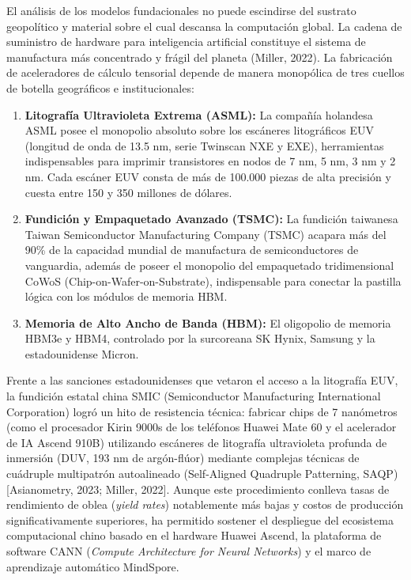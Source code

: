El análisis de los modelos fundacionales no puede escindirse del sustrato geopolítico y material sobre el cual descansa la computación global. La cadena de suministro de hardware para inteligencia artificial constituye el sistema de manufactura más concentrado y frágil del planeta (Miller, 2022). La fabricación de aceleradores de cálculo tensorial depende de manera monopólica de tres cuellos de botella geográficos e institucionales:
\begin{enumerate}
    \item \textbf{Litografía Ultravioleta Extrema (ASML):} La compañía holandesa ASML posee el monopolio absoluto sobre los escáneres litográficos EUV (longitud de onda de 13.5 nm, serie Twinscan NXE y EXE), herramientas indispensables para imprimir transistores en nodos de 7 nm, 5 nm, 3 nm y 2 nm. Cada escáner EUV consta de más de 100.000 piezas de alta precisión y cuesta entre 150 y 350 millones de dólares.
    \item \textbf{Fundición y Empaquetado Avanzado (TSMC):} La fundición taiwanesa Taiwan Semiconductor Manufacturing Company (TSMC) acapara más del 90\% de la capacidad mundial de manufactura de semiconductores de vanguardia, además de poseer el monopolio del empaquetado tridimensional CoWoS (Chip-on-Wafer-on-Substrate), indispensable para conectar la pastilla lógica con los módulos de memoria HBM.
    \item \textbf{Memoria de Alto Ancho de Banda (HBM):} El oligopolio de memoria HBM3e y HBM4, controlado por la surcoreana SK Hynix, Samsung y la estadounidense Micron.
\end{enumerate}

Frente a las sanciones estadounidenses que vetaron el acceso a la litografía EUV, la fundición estatal china SMIC (Semiconductor Manufacturing International Corporation) logró un hito de resistencia técnica: fabricar chips de 7 nanómetros (como el procesador Kirin 9000s de los teléfonos Huawei Mate 60 y el acelerador de IA Ascend 910B) utilizando escáneres de litografía ultravioleta profunda de inmersión (DUV, 193 nm de argón-flúor) mediante complejas técnicas de cuádruple multipatrón autoalineado (Self-Aligned Quadruple Patterning, SAQP) [Asianometry, 2023; Miller, 2022]. Aunque este procedimiento conlleva tasas de rendimiento de oblea (\textit{yield rates}) notablemente más bajas y costos de producción significativamente superiores, ha permitido sostener el despliegue del ecosistema computacional chino basado en el hardware Huawei Ascend, la plataforma de software CANN (\textit{Compute Architecture for Neural Networks}) y el marco de aprendizaje automático MindSpore.

